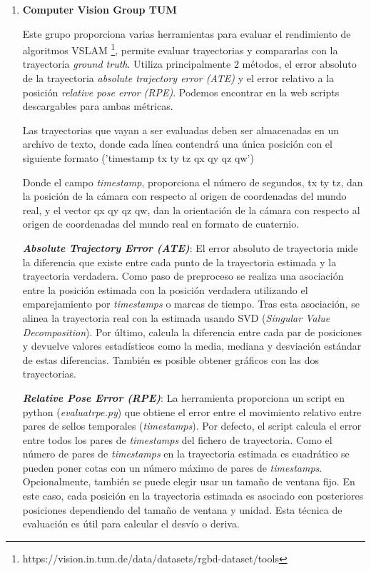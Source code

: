 \begin {enumerate}
\item\textbf{Computer Vision Group TUM}

Este grupo proporciona varias herramientas para evaluar el rendimiento de algoritmos VSLAM \footnote{https://vision.in.tum.de/data/datasets/rgbd-dataset/tools}, permite evaluar trayectorias y compararlas con la trayectoria \textit{ground truth}.\cite{sturm12iros}
Utiliza principalmente 2 métodos, el error absoluto de la trayectoria \textit{absolute trajectory error (ATE)} y el error relativo a la posición \textit{relative pose error (RPE)}. Podemos encontrar en la web scripts descargables para ambas métricas.

Las trayectorias que vayan a ser evaluadas deben ser almacenadas en un archivo de texto, donde cada línea contendrá una única posición con el siguiente formato ('timestamp tx ty tz qx qy qz qw')

Donde el campo \textit{timestamp}, proporciona el número de segundos, tx ty tz, dan la posición de la cámara con respecto al origen de coordenadas del mundo real, y el vector qx qy qz qw, dan la orientación de la cámara con respecto al origen de coordenadas del mundo real en formato de cuaternio. 


 \textbf{\textit{Absolute Trajectory Error (ATE)}}:
 El error absoluto de trayectoria mide la diferencia que existe entre cada punto de la trayectoria estimada y la trayectoria verdadera. Como paso de preproceso se realiza una asociación entre la posición estimada con la posición verdadera utilizando el emparejamiento por \textit{timestamps} o marcas de tiempo. Tras esta asociación, se alinea la trayectoria real con la estimada usando SVD (\textit{Singular Value Decomposition}). Por último, calcula la diferencia entre cada par de posiciones y devuelve valores estadísticos como la media, mediana y desviación estándar de estas diferencias. También es posible obtener gráficos con las dos trayectorias.

\textbf{\textit{Relative Pose Error (RPE)}}: 
La herramienta proporciona un script en python (\textit{evaluatrpe.py}) que obtiene el error entre el movimiento relativo entre pares de sellos temporales (\textit{timestamps}). Por defecto, el script calcula el error entre todos los pares de \textit{timestamps} del fichero de trayectoria. Como el número de pares de \textit{timestamps} en la trayectoria estimada es cuadrático se pueden poner cotas con un número máximo de pares de \textit{timestamps}. Opcionalmente, también se puede elegir usar un tamaño de ventana fijo. En este caso, cada posición en la trayectoria estimada es asociado con posteriores posiciones dependiendo del tamaño de ventana y unidad. Esta técnica de evaluación es útil para calcular el desvío o deriva.




\end{enumerate}
